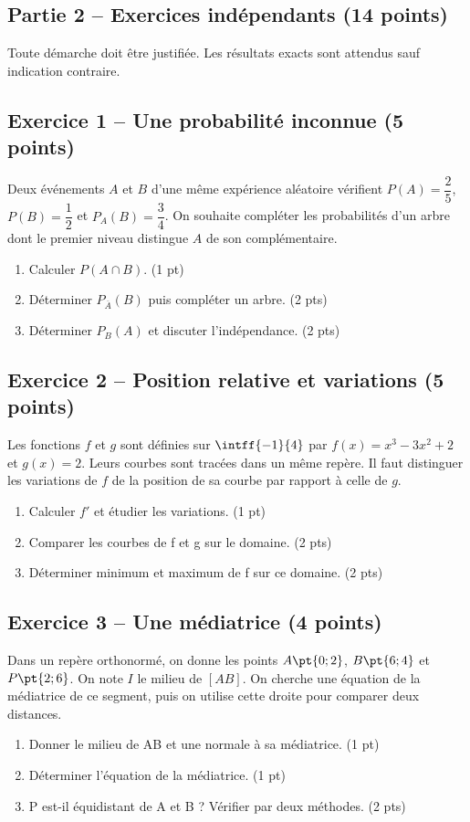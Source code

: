 \mxnewpage\subsection*{Partie 2 -- Exercices indépendants (14 points)}
Toute démarche doit être justifiée. Les résultats exacts sont attendus sauf indication contraire.
\subsection*{Exercice 1 -- Une probabilité inconnue (5 points)}
Deux événements $A$ et $B$ d’une même expérience aléatoire vérifient $P(A)=\dfrac25$, $P(B)=\dfrac12$ et $P_A(B)=\dfrac34$. On souhaite compléter les probabilités d’un arbre dont le premier niveau distingue $A$ de son complémentaire.
\begin{enumerate}
\item Calculer $P(A\cap B)$. \hfill(1 pt)
\item Déterminer $P_{\overline A}(B)$ puis compléter un arbre. \hfill(2 pts)
\item Déterminer $P_B(A)$ et discuter l’indépendance. \hfill(2 pts)
\end{enumerate}
\subsection*{Exercice 2 -- Position relative et variations (5 points)}
Les fonctions $f$ et $g$ sont définies sur $\intff{-1}{4}$ par $f(x)=x^3-3x^2+2$ et $g(x)=2$. Leurs courbes sont tracées dans un même repère. Il faut distinguer les variations de $f$ de la position de sa courbe par rapport à celle de $g$.
\begin{enumerate}
\item Calculer $f\prime$ et étudier les variations. \hfill(1 pt)
\item Comparer les courbes de f et g sur le domaine. \hfill(2 pts)
\item Déterminer minimum et maximum de f sur ce domaine. \hfill(2 pts)
\end{enumerate}
\subsection*{Exercice 3 -- Une médiatrice (4 points)}
Dans un repère orthonormé, on donne les points $A\pt{0;2}$, $B\pt{6;4}$ et $P\pt{2;6}$. On note $I$ le milieu de $[AB]$. On cherche une équation de la médiatrice de ce segment, puis on utilise cette droite pour comparer deux distances.
\begin{enumerate}
\item Donner le milieu de AB et une normale à sa médiatrice. \hfill(1 pt)
\item Déterminer l’équation de la médiatrice. \hfill(1 pt)
\item P est-il équidistant de A et B ? Vérifier par deux méthodes. \hfill(2 pts)
\end{enumerate}
